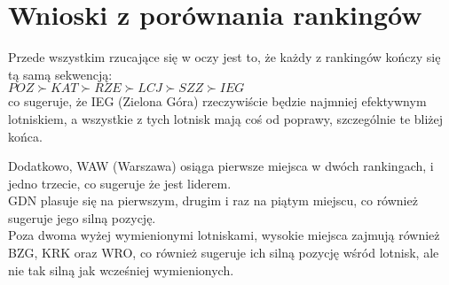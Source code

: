 \documentclass[a4paper,12pt]{article}
\begin{document}
\section{Wnioski z porównania rankingów}

    Przede wszystkim rzucające się w oczy jest to, że każdy z rankingów kończy się tą samą sekwencją:\\
    $POZ \succ KAT \succ RZE \succ LCJ \succ SZZ \succ IEG$ \\
    co sugeruje, że IEG (Zielona Góra) rzeczywiście będzie najmniej efektywnym lotniskiem, a wszystkie z tych lotnisk mają coś od poprawy, szczególnie te bliżej końca.

    Dodatkowo, WAW (Warszawa) osiąga pierwsze miejsca w dwóch rankingach, i jedno trzecie, co sugeruje że jest liderem.\\
    GDN plasuje się na pierwszym, drugim i raz na piątym miejscu, co również sugeruje jego silną pozycję.\\

    Poza dwoma wyżej wymienionymi lotniskami, wysokie miejsca zajmują również BZG, KRK oraz WRO, co również sugeruje ich silną pozycję wśród lotnisk, ale nie tak silną jak wcześniej wymienionych.
\end{document}
